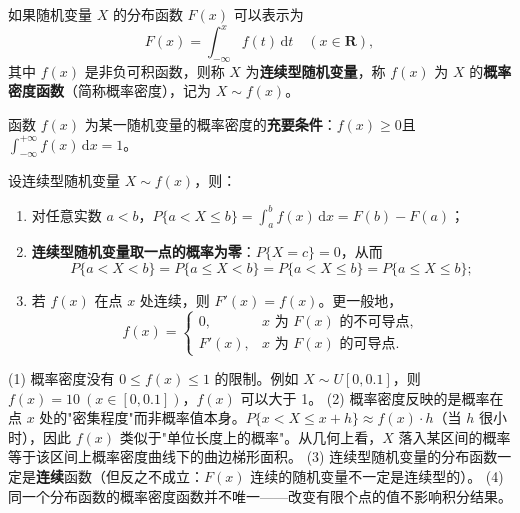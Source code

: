 \documentclass[lang=cn,11pt]{elegantbook}
\begin{document}
\begin{definition}[连续型随机变量] \label{def:continuous-rv}
如果随机变量 $X$ 的分布函数 $F(x)$ 可以表示为
\[
F(x) = \int_{-\infty}^{x} f(t)\,\mathrm{d}t \quad (x \in \mathbf{R}),
\]
其中 $f(x)$ 是非负可积函数，则称 $X$ 为\textbf{连续型随机变量}，称 $f(x)$ 为 $X$ 的\textbf{概率密度函数}（简称概率密度），记为 $X \sim f(x)$。
\end{definition}
\begin{property}\label{prop:pdf-property}
函数 $f(x)$ 为某一随机变量的概率密度的\textbf{充要条件}：$f(x) \ge 0$且 $\displaystyle\int_{-\infty}^{+\infty} f(x)\,\mathrm{d}x = 1$。
\end{property}

\begin{property}\label{prop:continuous-rv-calc}
设连续型随机变量 $X \sim f(x)$，则：
\begin{enumerate}
    \item 对任意实数 $a < b$，$\displaystyle P\{a < X \le b\} = \int_a^b f(x)\,\mathrm{d}x = F(b) - F(a)$；
    \item \textbf{连续型随机变量取一点的概率为零}：$P\{X = c\} = 0$，从而
    \[
    P\{a < X < b\} = P\{a \le X < b\} = P\{a < X \le b\} = P\{a \le X \le b\};
    \]
    \item 若 $f(x)$ 在点 $x$ 处连续，则 $F'(x) = f(x)$。更一般地，
    \[
    f(x) = \begin{cases}
    0, & x \text{ 为 } F(x) \text{ 的不可导点}, \\
    F'(x), & x \text{ 为 } F(x) \text{ 的可导点}.
    \end{cases}
    \]
\end{enumerate}
\end{property}

\begin{remark}
(1) 概率密度没有 $0 \le f(x) \le 1$ 的限制。例如 $X \sim U[0, 0.1]$，则 $f(x) = 10\ (x \in [0, 0.1])$，$f(x)$ 可以大于 1。\newline
(2) 概率密度反映的是概率在点 $x$ 处的"密集程度"而非概率值本身。$P\{x < X \le x+h\} \approx f(x) \cdot h$（当 $h$ 很小时），因此 $f(x)$ 类似于"单位长度上的概率"。从几何上看，$X$ 落入某区间的概率等于该区间上概率密度曲线下的曲边梯形面积。\newline
(3) 连续型随机变量的分布函数一定是\textbf{连续}函数（但反之不成立：$F(x)$ 连续的随机变量不一定是连续型的）。\newline
(4) 同一个分布函数的概率密度函数并不唯一——改变有限个点的值不影响积分结果。
\end{remark}
\end{document}
